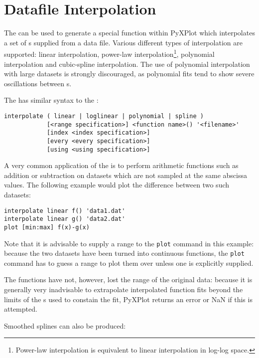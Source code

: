 \section{Datafile Interpolation}
\label{sec:spline_command}

The  can be used to generate a special function within
PyXPlot which interpolates a set of \datapoint s supplied from a data file.
Various different types of interpolation are supported: linear interpolation,
power-law interpolation\footnote{Power-law interpolation is equivalent to
linear interpolation in log-log space.}, polynomial interpolation and
cubic-spline interpolation. The use of polynomial interpolation with large
datasets is strongly discouraged, as polynomial fits tend to show severe
oscillations between \datapoint s.

The  has similar syntax to the :

\begin{verbatim}
interpolate ( linear | loglinear | polynomial | spline )
            [<range specification>] <function name>() '<filename>' 
            [index <index specification>]
            [every <every specification>]
            [using <using specification>]
\end{verbatim}

A very common application of the  is to perform arithmetic
functions such as addition or subtraction on datasets which are not sampled at
the same abscissa values. The following example would plot the difference
between two such datasets:

\begin{verbatim}
interpolate linear f() 'data1.dat'
interpolate linear g() 'data2.dat'
plot [min:max] f(x)-g(x)
\end{verbatim}

\noindent Note that it is advisable to supply a range to the {\tt plot} command
in this example: because the two datasets have been turned into continuous
functions, the {\tt plot} command has to guess a range to plot them over unless
one is explicitly supplied.

The functions have not, however, lost the range of the original data: because
it is generally very inadvisable to extrapolate interpolated function fits
beyond the limits of the \datapoint s used to constain the fit, PyXPlot returns
an error or NaN if this is attempted.

Smoothed splines can also be produced:

